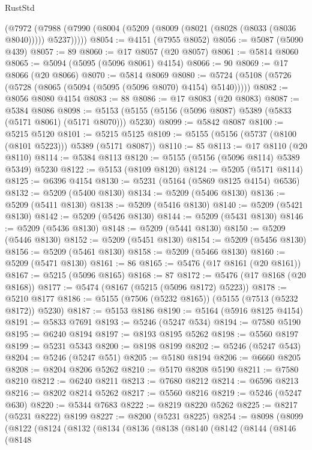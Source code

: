 \begin{lexlean}{RustStd}
\begin{coremodule}
    (@7972 (@7988 (@7990 (@8004 (@5209 (@8009 (@8021 (@8028 (@8033 (@8036 @8040))))) @5237)))))
@8054 := @4151 (@7955 @8052)
@8056 := @5087 (@5090 @439)
@8057 := 89
@8060 := @17 @8057 (@20 @8057)
@8061 := @5814 @8060
@8065 := @5094 (@5095 (@5096 @8061) @4154)
@8066 := 90
@8069 := @17 @8066 (@20 @8066)
@8070 := @5814 @8069
@8080 := @5724 (@5108 (@5726 (@5728 (@8065 (@5094 (@5095 (@5096 @8070) @4154) @5140)))))
@8082 := @8056 @8080 @4154
@8083 := 88
@8086 := @17 @8083 (@20 @8083)
@8087 := @5384 @8086
@8098 := @5153 (@5155 (@5156 (@5096 @8087) @5389 (@5833 (@5171 @8061) (@5171 @8070))) @5230)
@8099 := @5842 @8087
@8100 := @5215 @5120
@8101 := @5215 @5125
@8109 := @5155 (@5156 (@5737 (@8100 (@8101 @5223))) @5389 (@5171 @8087))
@8110 := 85
@8113 := @17 @8110 (@20 @8110)
@8114 := @5384 @8113
@8120 := @5155 (@5156 (@5096 @8114) @5389 @5349) @5230
@8122 := @5153 (@8109 @8120)
@8124 := @5205 (@5171 @8114)
@8125 := @6396 @4154
@8130 := @5231 (@5164 (@5869 @8125 @4154) @6536)
@8132 := @5209 (@5400 @8130)
@8134 := @5209 (@5406 @8130)
@8136 := @5209 (@5411 @8130)
@8138 := @5209 (@5416 @8130)
@8140 := @5209 (@5421 @8130)
@8142 := @5209 (@5426 @8130)
@8144 := @5209 (@5431 @8130)
@8146 := @5209 (@5436 @8130)
@8148 := @5209 (@5441 @8130)
@8150 := @5209 (@5446 @8130)
@8152 := @5209 (@5451 @8130)
@8154 := @5209 (@5456 @8130)
@8156 := @5209 (@5461 @8130)
@8158 := @5209 (@5466 @8130)
@8160 := @5209 (@5471 @8130)
@8161 := 86
@8165 := @5476 (@17 @8161 (@20 @8161))
@8167 := @5215 (@5096 @8165)
@8168 := 87
@8172 := @5476 (@17 @8168 (@20 @8168))
@8177 := @5474 (@8167 (@5215 (@5096 @8172) @5223))
@8178 := @5210 @8177
@8186 := @5155 (@7506 (@5232 @8165)) (@5155 (@7513 (@5232 @8172)) @5230)
@8187 := @5153 @8186
@8190 := @5164 (@5916 @8125 @4154)
@8191 := @5833 @7691
@8193 := @5246 (@5247 @534)
@8194 := @7580 @5190
@8195 := @6240 @8194
@8197 := @8193 @8195 @5262
@8198 := @5560 @8197
@8199 := @5231 @5343
@8200 := @8198 @8199
@8202 := @5246 (@5247 @543)
@8204 := @5246 (@5247 @551)
@8205 := @5180 @8194
@8206 := @6660 @8205
@8208 := @8204 @8206 @5262
@8210 := @5170 @8208 @5190
@8211 := @7580 @8210
@8212 := @6240 @8211
@8213 := @7680 @8212
@8214 := @6596 @8213
@8216 := @8202 @8214 @5262
@8217 := @5560 @8216
@8219 := @5246 (@5247 @630)
@8220 := @5344 @7683
@8222 := @8219 @8220 @5262
@8225 := @8217 (@5231 @8222) @8199
@8227 := @8200 (@5231 @8225)
@8254 := @8098
    (@8099
      (@8122
        (@8124
          (@8132
            (@8134
              (@8136
                (@8138
                  (@8140
                    (@8142
                      (@8144
                        (@8146
                          (@8148

\end{coremodule}
\end{lexlean}

